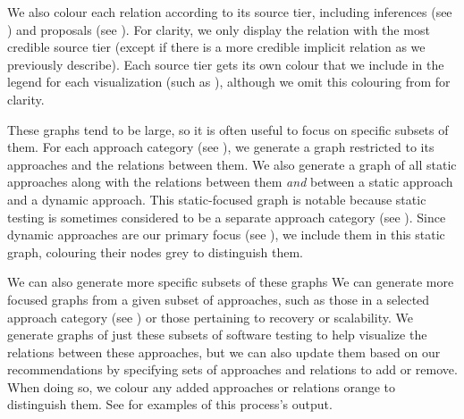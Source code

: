     We also colour each relation according to its source tier, including
    inferences (see ) and proposals (see ). For
    clarity, we only display the relation with the most credible source tier
    (except if there is a more credible implicit relation as we previously
    describe). Each source tier gets its own colour that we include in the
    legend for each visualization (such as ),
    although we omit this colouring from  for clarity.

\fi
These graphs tend to be large, so it is often useful to focus on specific
subsets of them. \ifnotpaper For each approach category (see
    ), we generate a graph restricted to its approaches
    and the relations between them. We also generate a graph of all static
    approaches along with the relations between them \emph{and} between a
    static approach and a dynamic approach. This static-focused graph is
    notable because static testing is sometimes considered to be a separate
    approach category (see ). Since dynamic
    approaches are our primary focus (see ), we include them
    in this static graph, colouring their nodes grey to distinguish them.

    We can also generate more specific subsets of these graphs
\else We can generate more focused graphs \fi from a given subset of
approaches, such as \ifnotpaper\else those in a selected approach category
    (see ) or \fi those pertaining to recovery or
scalability\ifnotpaper.
We generate graphs of just these subsets of software testing to help visualize
the relations between these approaches, but we can also update them based on
our recommendations by specifying sets of approaches and relations to add or
remove. %
When doing so, we colour any added approaches or relations orange to
distinguish them. %
See  for examples of this process's output.


\else
\flawMnfstsTable{}
\flawDmnsTable{}
\fi
